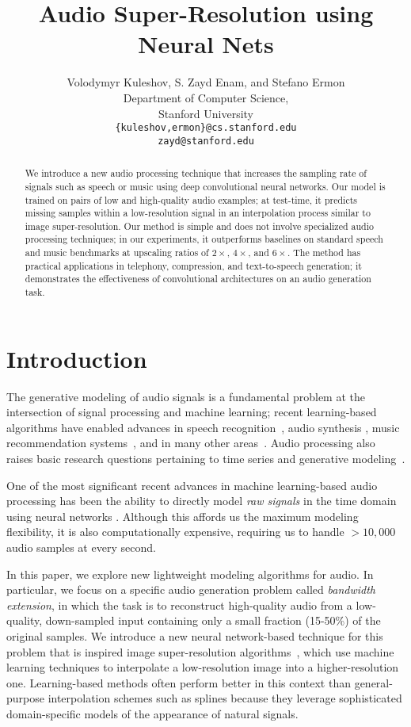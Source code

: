 \documentclass{article} \usepackage{iclr2017_workshop,times}
\title{ Audio Super-Resolution using Neural Nets }
\author{Volodymyr Kuleshov, S. Zayd Enam, and Stefano Ermon \\
Department of Computer Science, \\
Stanford University\\
\texttt{\{kuleshov,ermon\}@cs.stanford.edu}\\
\texttt{zayd@stanford.edu}
}
\begin{document}
\maketitle

\begin{abstract}
We introduce a new audio processing technique that increases the sampling rate of  signals such as speech or music using deep convolutional neural networks.
Our model is trained on pairs of low and high-quality audio examples; at test-time, it predicts missing samples within a low-resolution signal in an interpolation process 
similar to image super-resolution.
Our method is simple and does not involve specialized audio processing techniques; in our experiments, it outperforms baselines 
on standard speech and music benchmarks at upscaling ratios of $2\times$, $4\times$, and $6\times$. The method has practical applications in telephony, compression, and text-to-speech generation; it demonstrates the effectiveness of convolutional architectures on an audio generation task.

\end{abstract}

\section{Introduction}

The generative modeling of audio signals is a fundamental problem at the intersection of signal processing and machine learning; recent learning-based algorithms have enabled advances in speech recognition~\citep{hinton2012deep}, audio synthesis \citep{DBLP:journals/corr/OordDZSVGKSK16, mehri2016samplernn}, music recommendation systems~\citep{coviello2012multivariate, wang2014improving, liang2015content}, and in many other areas~\citep{acevedo2009automated}. Audio processing also raises basic research questions pertaining to time series and generative modeling~\citep{haykin2005cocktail,bilmes2004graphical}.

One of the most significant recent advances in machine learning-based audio processing has been the ability to directly model {\em raw signals} in the time domain using neural networks \citep{DBLP:journals/corr/OordDZSVGKSK16, mehri2016samplernn}. Although this affords us the maximum modeling flexibility, it is also computationally expensive, requiring us to handle $>10,000$ audio samples at every second. 

In this paper, we explore new lightweight modeling algorithms for audio.
In particular, we focus on a specific audio generation problem called {\em bandwidth extension}, in which the task is to reconstruct high-quality audio from a low-quality, down-sampled input containing only a small fraction (15-50\%) of the original samples. We introduce a new neural network-based technique for this problem that is inspired image super-resolution algorithms~\citep{Dong:2016:ISU:2914182.2914303}, which use machine learning techniques to interpolate a low-resolution image into a higher-resolution one. Learning-based methods often perform better in this context than general-purpose interpolation schemes such as splines because they leverage sophisticated domain-specific models of the appearance of natural signals.
 
\end{document}
